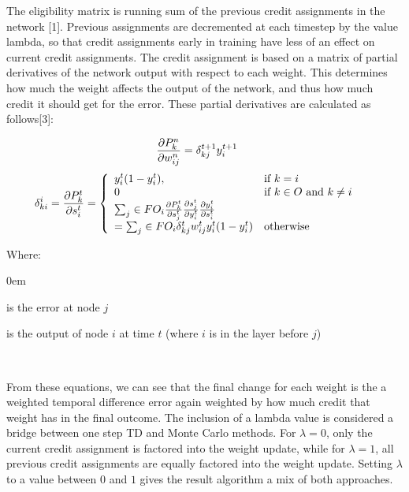 \documentclass{sig-alternate-05-2015}
\begin{document}
The eligibility matrix is running sum of the previous credit assignments in the network [1]. Previous assignments are decremented at each timestep by the value lambda, so that credit assignments early in training have less of an effect on current credit assignments. The credit assignment is based on a matrix of partial derivatives of the network output with respect to each weight. This determines how much the weight affects the output of the network, and thus how much credit it should get for the error. These partial derivatives are calculated as follows[3]:

\begin{equation}
\hspace*{-.5cm}\frac{\partial P_k^n}{\partial w_{ij}^n} = \delta_{kj}^{t+1} y_i^{t+1}
\end{equation}
\begin{equation}
\hspace*{-.5cm}\delta_{ki}^{i}= \frac{\partial P_k^t}{\partial s_{i}^t} =
\left\{
	\begin{array}{lll}
		y_{i}^{t} (1 - y_{i}^{t}), & \mbox{if } k = i \\
		0 & \mbox{if } k \in  O \text{ and } k \neq i\\
		\sum_{j} \in FO_i \frac{\partial P_k^t}{\partial s_{j}^t} \frac{\partial s_j^t}{\partial y_{i}^t} \frac{\partial y_i^t}{\partial s_{i}^t}\\ =  
		\sum_{j} \in FO_i \delta_{kj}^{t} w_{ij}^{t} y_i^t (1 - y_i^t) & \mbox{otherwise}
	\end{array}
\right.
\end{equation}

Where:
\begin{description}
\itemsep0em 
\item [\delta_{ki}^i] is the error at node $j$
\item[y_i^t] is the output of node $i$  at time $t$ (where $i$ is in the layer before $j$)
\end{description} 
\


From these equations, we can see that the final change for each weight is the a weighted temporal difference error again weighted by how much credit that weight has in the final outcome. The inclusion of a lambda value is considered a bridge between one step TD and Monte Carlo methods. For $\lambda=0$, only the current credit assignment is factored into the weight update, while for $\lambda=1$, all previous credit assignments are equally factored into the weight update. Setting $\lambda$ to a value between $0$ and $1$ gives the result algorithm a mix of both approaches.
\end{document}
